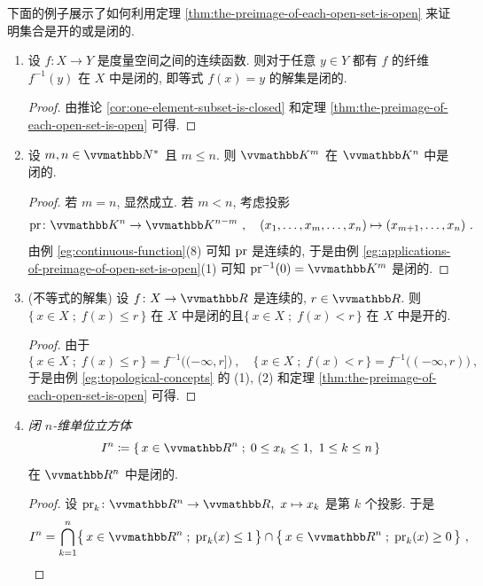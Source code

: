 下面的例子展示了如何利用定理 \ref{thm:the-preimage-of-each-open-set-is-open} 来证明集合是开的或是闭的.

\begin{example}\label{eg:applications-of-preimage-of-open-set-is-open}
    \begin{enumerate}
        \item 设 \(f \colon X \to Y\) 是度量空间之间的连续函数. 则对于任意 \(y \in Y\) 都有 \(f\) 的纤维 \(f^{- 1}(y)\) 在 \(X\) 中是闭的, 即等式 \(f(x) = y\) 的解集是闭的.
        \begin{proof}
            由推论 \ref{cor:one-element-subset-is-closed} 和定理 \ref{thm:the-preimage-of-each-open-set-is-open} 可得.
        \end{proof}
        \item 设 \(m, n \in \N^\ast\) 且 \(m \leq n\). 则 \(\K^m\) 在 \(\K^n\) 中是闭的.
        \begin{proof}
            若 \(m = n\), 显然成立. 若 \(m < n\), 考虑投影
            \[
                \pr \colon \K^n \to \K^{n - m}\ ,\quad (x_1, \ldots, x_m, \ldots, x_n) \mapsto (x_{m + 1}, \ldots, x_n)\ .
            \]
            由例 \ref{eg:continuous-function}(8) 可知 \(\operatorname{pr}\) 是连续的, 于是由例 \ref{eg:applications-of-preimage-of-open-set-is-open}(1) 可知 \(\pr^{- 1}(0) = \K^m\) 是闭的.
        \end{proof}
        \item (不等式的解集) 设 \(f \colon X \to \R\) 是连续的, \(r \in \R\). 则 \(\bigl\{\, x \in X \;;\; f(x) \leq r \,\bigr\}\) 在 \(X\) 中是闭的且\(\bigl\{\, x \in X \;;\; f(x) < r \,\bigr\}\) 在 \(X\) 中是开的.
        \begin{proof}
            由于
            \[
                \bigl\{\, x \in X \;;\; f(x) \leq r \,\bigr\} = f^{- 1}\bigl((- \infty, r]\bigr)\ ,\quad \bigl\{\, x \in X \;;\; f(x) < r \,\bigr\} = f^{- 1}\bigl((- \infty, r)\bigr)\ ,
            \]
            于是由例 \ref{eg:topological-concepts} 的 (1), (2) 和定理 \ref{thm:the-preimage-of-each-open-set-is-open} 可得.
        \end{proof}
        \item \textsl{闭 \(n\)-维单位立方体
        \[
            I^n \coloneqq \{\, x \in \R^n \;;\; 0 \leq x_k \leq 1,\ 1 \leq k \leq n \,\}
        \]
        } 在 \(\R^n\) 中是闭的.
        \begin{proof}
            设 \(\pr_k \colon \R^n \to \R,\ x \mapsto x_k\) 是第 \(k\) 个投影. 于是
            \[
                I^n = \bigcap_{k = 1}^n \bigl\{\, x \in \R^n \;;\; \pr_k(x) \leq 1 \,\bigr\} \cap \bigl\{\, x \in \R^n \;;\; \pr_k(x) \geq 0 \,\bigr\}\ ,
\]
\end{proof}
\end{enumerate}
\end{example}
